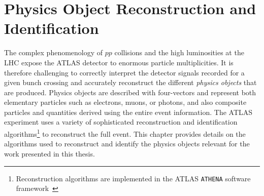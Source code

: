 
\chapter{Physics Object Reconstruction and Identification}
\label{chap:objects}

The complex phenomenology of $pp$ collisions and the high luminosities at the LHC expose the ATLAS detector to enormous particle multiplicities. It is therefore challenging to correctly interpret the detector signals recorded for a given bunch crossing and accurately reconstruct the different \emph{physics objects} that are produced.
Physics objects are described with four-vectors and represent both elementary particles such as electrons, muons, or photons, and also composite particles and quantities derived using the entire event information.
The ATLAS experiment uses a variety of sophisticated reconstruction and identification algorithms\footnote{Reconstruction algorithms are implemented in the ATLAS \texttt{ATHENA} software framework~\cite{ATLAS-TDR-17}} to reconstruct the full event.
This chapter provides details on the algorithms used to reconstruct and identify the physics objects relevant for the work presented in this thesis.




